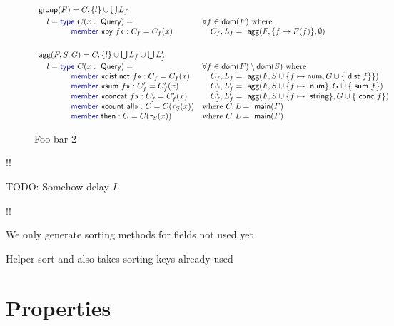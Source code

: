 \documentclass[a4paper,UKenglish]{lipics-v2016}
\newcommand{\kvd}[1]{\textnormal{\textcolor{kvdclr}{\sffamily #1}}}
\newcommand{\ident}[1]{\textnormal{\sffamily #1}}
\newcommand{\qident}[1]{\textnormal{\sffamily \guillemotleft #1\guillemotright}}
\newcommand{\dom}{\ident{dom}}
\begin{document}
\begin{figure}
\begin{equation*}
\begin{array}{ll}
\ident{group}(F) = C, \{l\} \cup \bigcup L_f \\[0.25em]
\quad l = \kvd{type}~C(x:\ident{Query}) = &\forall f\in\dom(F)~\textnormal{where} \\
\qquad \qquad \kvd{member}~\qident{by $f$} : C_f = C_f(x) &\quad C_f, L_f = \ident{agg}(F, \{ f \mapsto F(f) \}, \emptyset)\\
\\[0.5em]
\ident{agg}(F,S,G) = C, \{l\} \cup \bigcup L_f \cup \bigcup L'_f\\[0.25em]
\quad l = \kvd{type}~C(x:\ident{Query}) = &\forall f\in\dom(F)\setminus\dom(S)~\textnormal{where} \\
\qquad \qquad \kvd{member}~\qident{distinct $f$} : C_f = C_f(x) &\quad C_f, L_f = \ident{agg}(F, S\cup\{ f \mapsto \ident{num}, G\cup\{\ident{dist}~f\} \})\\
\qquad \qquad \kvd{member}~\qident{sum $f$} : C'_f = C'_f(x) &\quad C'_f, L'_f = \ident{agg}(F, S\cup\{ f \mapsto \ident{num} \}, G\cup\{\ident{sum}~f\})\\
\qquad \qquad \kvd{member}~\qident{concat $f$} : C'_f = C'_f(x) &\quad C'_f, L'_f = \ident{agg}(F, S\cup\{ f \mapsto \ident{string} \}, G\cup\{\ident{conc}~f\})\\
\qquad \qquad \kvd{member}~\qident{count all} : C = C(\tau_S(x))                 &\textnormal{where}~C, L = \ident{main}(F)\\
\qquad \qquad \kvd{member}~\ident{then} : C = C(\tau_S(x))                 &\textnormal{where}~C, L = \ident{main}(F)\\
\end{array}
\end{equation*}
\caption{Foo bar 2}
\label{fig:foobar2}
\end{figure}


!!

TODO: Somehow delay $L$

!!

We only generate sorting methods for fields not used yet

Helper \ident{sort-and} also takes sorting keys already used

\section{Properties}
\label{sec:proofs}
\end{document}
